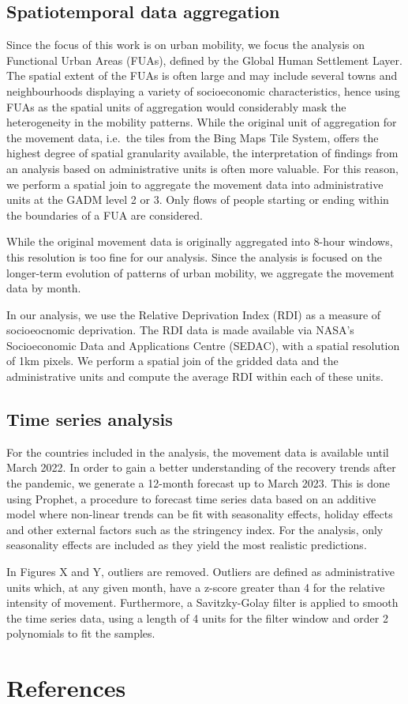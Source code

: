 \documentclass[
  11pt,
]{article}
\begin{document}
\subsection{Spatiotemporal data
aggregation}\label{spatiotemporal-data-aggregation}

Since the focus of this work is on urban mobility, we focus the analysis
on Functional Urban Areas (FUAs), defined by the Global Human Settlement
Layer. The spatial extent of the FUAs is often large and may include
several towns and neighbourhoods displaying a variety of socioeconomic
characteristics, hence using FUAs as the spatial units of aggregation
would considerably mask the heterogeneity in the mobility patterns.
While the original unit of aggregation for the movement data, i.e.~the
tiles from the Bing Maps Tile System, offers the highest degree of
spatial granularity available, the interpretation of findings from an
analysis based on administrative units is often more valuable. For this
reason, we perform a spatial join to aggregate the movement data into
administrative units at the GADM level 2 or 3. Only flows of people
starting or ending within the boundaries of a FUA are considered.

While the original movement data is originally aggregated into 8-hour
windows, this resolution is too fine for our analysis. Since the
analysis is focused on the longer-term evolution of patterns of urban
mobility, we aggregate the movement data by month.

In our analysis, we use the Relative Deprivation Index (RDI) as a
measure of socioeocnomic deprivation. The RDI data is made available via
NASA's Socioeconomic Data and Applications Centre (SEDAC), with a
spatial resolution of 1km pixels. We perform a spatial join of the
gridded data and the administrative units and compute the average RDI
within each of these units.

\subsection{Time series analysis}\label{time-series-analysis}

For the countries included in the analysis, the movement data is
available until March 2022. In order to gain a better understanding of
the recovery trends after the pandemic, we generate a 12-month forecast
up to March 2023. This is done using Prophet, a procedure to forecast
time series data based on an additive model where non-linear trends can
be fit with seasonality effects, holiday effects and other external
factors such as the stringency index. For the analysis, only seasonality
effects are included as they yield the most realistic predictions.

In Figures X and Y, outliers are removed. Outliers are defined as
administrative units which, at any given month, have a z-score greater
than 4 for the relative intensity of movement. Furthermore, a
Savitzky-Golay filter is applied to smooth the time series data, using a
length of 4 units for the filter window and order 2 polynomials to fit
the samples.

\section{References}\label{references}
\end{document}
